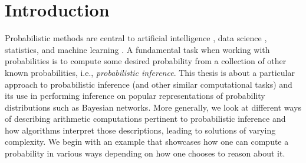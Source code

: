 


\chapter{Introduction}\label{chapter:introduction}



Probabilistic methods are central to artificial intelligence
\citep{DBLP:books/aw/RN2020}, data science \citep{provost2013data}, statistics,
and machine learning \citep{DBLP:books/lib/Bishop07,DBLP:books/daglib/0023091}.
A fundamental task when working with probabilities is to compute some desired
probability from a collection of other known probabilities, i.e.,
\emph{probabilistic inference}. This thesis is about a particular approach to
probabilistic inference (and other similar computational tasks) and its use in
performing inference on popular representations of probability distributions
such as Bayesian networks. More generally, we look at different ways of
describing arithmetic computations pertinent to probabilistic inference and how
algorithms interpret those descriptions, leading to solutions of varying
complexity. We begin with an example that showcases how one can compute a
probability in various ways depending on how one chooses to reason about it.

